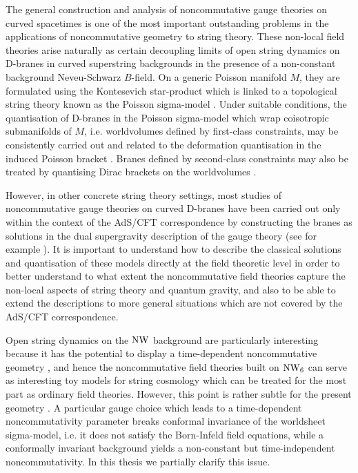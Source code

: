 The general construction and analysis of noncommutative gauge theories on curved
spacetimes is one of the most important outstanding problems in the applications
of noncommutative geometry to string theory. These non-local field theories
arise naturally as certain decoupling limits of open string dynamics on D-branes
in curved superstring backgrounds in the presence of a non-constant background
Neveu-Schwarz $B$-field. On a generic Poisson manifold $M$, they are formulated
using the Kontesevich star-product \cite{Kont1} which is linked to a topological
string theory known as the Poisson sigma-model \cite{CattFel1}. Under suitable
conditions, the quantisation of D-branes in the Poisson sigma-model which wrap
coisotropic submanifolds of $M$, i.e. worldvolumes defined by first-class
constraints, may be consistently carried out and related to the deformation
quantisation in the induced Poisson bracket \cite{CattFel2}. Branes defined by
second-class constraints may also be treated by quantising Dirac brackets on the
worldvolumes \cite{CFal1}.

However, in other concrete string theory settings, most studies of
noncommutative gauge theories on curved D-branes have been carried out only
within the context of the AdS/CFT correspondence by constructing the branes as
solutions in the dual supergravity description of the gauge theory (see for
example \cite{Cai1,CLO1,HS1,HashTh1,ASY1}). It is important to understand
how to describe the classical solutions and quantisation of these models
directly at the field theoretic level in order to better understand to what
extent the noncommutative field theories capture the non-local aspects of string
theory and quantum gravity, and also to be able to extend the descriptions to
more general situations which are not covered by the AdS/CFT correspondence.

Open string dynamics on the $\operatorname{NW}$ background are particularly interesting
because it has the potential to display a time-dependent noncommutative geometry
\cite{DN1,HS1}, and hence the noncommutative field theories built on $\operatorname{NW}_6$ can
serve as interesting toy models for string cosmology which can be treated for
the most part as ordinary field theories. However, this point is rather subtle
for the present geometry \cite{DN1,HT1}. A particular gauge choice which leads
to a time-dependent noncommutativity parameter breaks conformal invariance of
the worldsheet sigma-model, i.e. it does not satisfy the Born-Infeld field
equations, while a conformally invariant background yields a non-constant but
time-independent noncommutativity. In this thesis we partially clarify this
issue.

